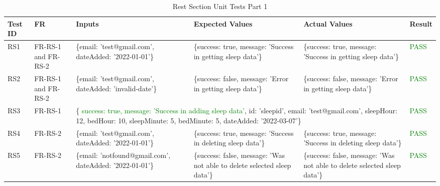 \documentclass[12pt, titlepage]{article}
\begin{document}
\begin{table}[h]
    \centering
    \small
    \begin{tabularx}{\textwidth}{|X|X|p{3cm}|p{2.5cm}|p{2.5cm}|X|}
        \hline
        Test ID & FR & Inputs & Expected Values & Actual Values & Result \\
        \hline
        RS1 & FR-RS-1 and FR-RS-2 & \{email: 'test@gmail.com', dateAdded: '2022-01-01'\}  & \{success: true, message: 'Success in getting sleep data'\} & \{success: true, message: 'Success in getting sleep data'\} & \textcolor{Green}{PASS} \\
        \hline
        RS2 & FR-RS-1 and FR-RS-2 & \{email: 'test@gmail.com', dateAdded: 'invalid-date'\}  & \{success: false, message: 'Error in getting sleep data'\} & \{success: false, message: 'Error in getting sleep data'\} & \textcolor{Green}{PASS} \\
        \hline
        RS3 & FR-RS-1 & \multicolumn{3}{p{8cm}|}{\centering \{ \textcolor{Green}{success: true, message: 'Success in adding sleep data'}, id: 'sleepid', email: 'test@gmail.com', sleepHour: 12, bedHour: 10, sleepMinute: 5, bedMinute: 5, dateAdded: '2022-03-07'\}}  &  \textcolor{Green}{PASS}\\
        \hline
        RS4 & FR-RS-2 & \{email: 'test@gmail.com', dateAdded: '2022-01-01'\}  & \{success: true, message: 'Success in deleting sleep data'\} & \{success: true, message: 'Success in deleting sleep data'\} & \textcolor{Green}{PASS} \\
        \hline
        RS5 & FR-RS-2 & \{email: 'notfound@gmail.com', dateAdded: '2022-01-01'\}  & \{success: false, message: 'Was not able to delete selected sleep data'\} & \{success: false, message: 'Was not able to delete selected sleep data'\} & \textcolor{Green}{PASS} \\
        \hline
    \end{tabularx}
    \caption{Rest Section Unit Tests Part 1}
    \label{table:rest-unit-tests}
\end{table}

\newpage
\end{document}
